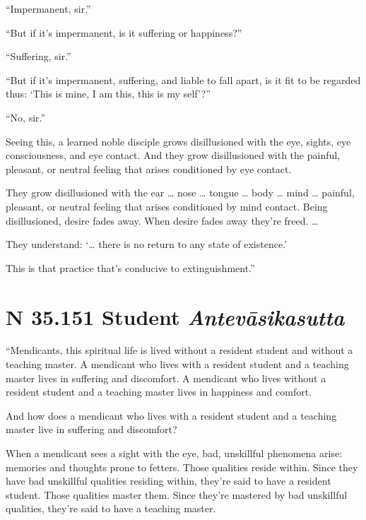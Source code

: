 \documentclass[12pt,openany]{book}%
\newcommand*{\suttatitleacronym}[1]{\smaller[2]{#1}\vspace*{.3em}}
\newcommand*{\suttatitletranslation}[1]{\linebreak{#1}}
\newcommand*{\suttatitleroot}[1]{\linebreak\smaller[2]\itshape{#1}}
\newcommand*{\tocacronym}[1]{\hspace*{-3.3em}{#1}\quad}
\newcommand*{\toctranslation}[1]{#1}
\newcommand*{\tocroot}[1]{(\textit{#1})}
\begin{document}
“Impermanent, sir.” 

“But if it’s impermanent, is it suffering or happiness?” 

“Suffering, sir.” 

“But if it’s impermanent, suffering, and liable to fall apart, is it fit to be regarded thus: ‘This is mine, I am this, this is my self’?” 

“No, sir.” 

Seeing this, a learned noble disciple grows disillusioned with the eye, sights, eye consciousness, and eye contact. And they grow disillusioned with the painful, pleasant, or neutral feeling that arises conditioned by eye contact. 

They grow disillusioned with the ear … nose … tongue … body … mind … painful, pleasant, or neutral feeling that arises conditioned by mind contact. Being disillusioned, desire fades away. When desire fades away they’re freed. … 

They understand: ‘… there is no return to any state of existence.’ 

This is that practice that’s conducive to extinguishment.” 

%
\section*{{\suttatitleacronym SN 35.151}{\suttatitletranslation A Student }{\suttatitleroot Antevāsikasutta}}
\addcontentsline{toc}{section}{\tocacronym{SN 35.151} \toctranslation{A Student } \tocroot{Antevāsikasutta}}

“Mendicants, this spiritual life is lived without a resident student and without a teaching master. A mendicant who lives with a resident student and a teaching master lives in suffering and discomfort. A mendicant who lives without a resident student and a teaching master lives in happiness and comfort. 

And how does a mendicant who lives with a resident student and a teaching master live in suffering and discomfort? 

When a mendicant sees a sight with the eye, bad, unskillful phenomena arise: memories and thoughts prone to fetters. Those qualities reside within. Since they have bad unskillful qualities residing within, they’re said to have a resident student. Those qualities master them. Since they’re mastered by bad unskillful qualities, they’re said to have a teaching master. 
\end{document}
